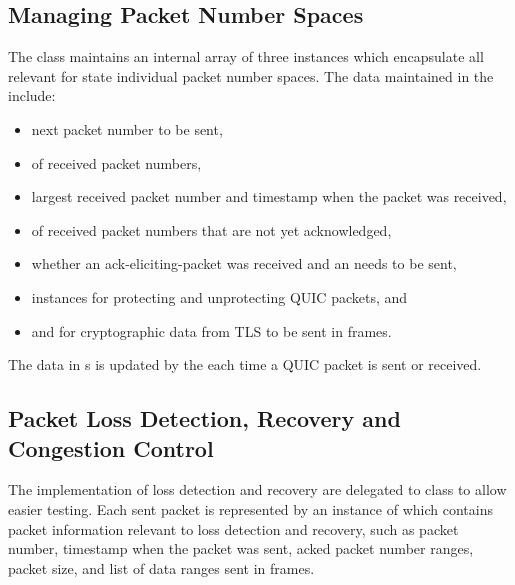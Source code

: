 \subsection{Managing Packet Number Spaces}

The \ManagedQuicConnection{} class maintains an internal array of three \PacketNumberSpace{}
instances which encapsulate all relevant for state individual packet number spaces. The data
maintained in the \PacketNumberSpace{} include:

\begin{itemize}

  \item next packet number to be sent,

  \item \PacketNumberWindow{} of received packet numbers,

  \item largest received packet number and timestamp when the packet was received,

  \item \RangeSet{} of received packet numbers that are not yet acknowledged,

  \item whether an \gls{ack-eliciting-packet} was received and an \ACK{} needs to be sent,

  \item \CryptoSeal{} instances for protecting and unprotecting QUIC packets, and

  \item \SendStream{} and \ReceiveStream{} for cryptographic data from TLS to be sent in \CRYPTO{} frames.

\end{itemize}

The data in \PacketNumberSpace{}s is updated by the \ManagedQuicConnection{} each time a QUIC packet
is sent or received.

\subsection{Packet Loss Detection, Recovery and Congestion Control}

The implementation of loss detection and recovery are delegated to \RecoveryController{} class to
allow easier testing. Each sent packet is represented by an instance of \SentPacket{} which contains
packet information relevant to loss detection and recovery, such as packet number, timestamp when
the packet was sent, acked packet number ranges, packet size, and list of data ranges sent in
\STREAM{} frames.

